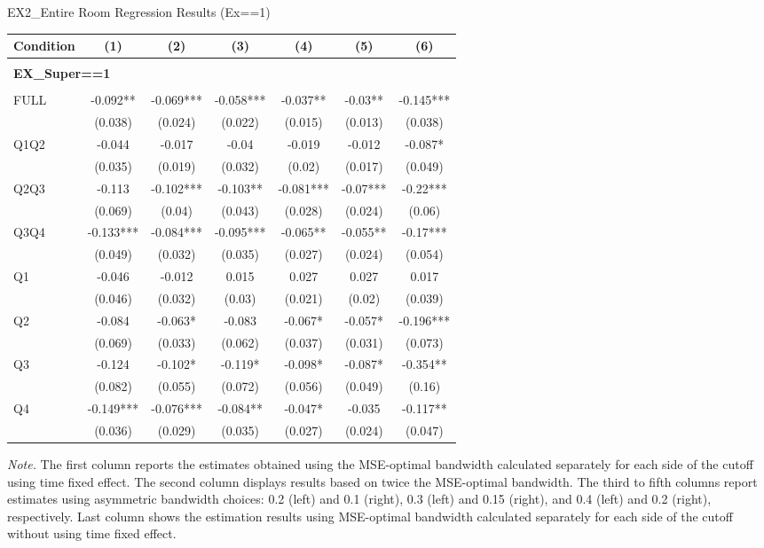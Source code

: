 \begin{table}[]
\TABLE
{EX2\_Entire Room Regression Results (Ex==1) \label{ex2_result_detail1}}{\begin{tabular}{lcccccc}
\hline
Condition & (1) & (2) & (3) & (4) & (5) & (6) \\ \hline
\\ 
\multicolumn{5}{l}{\textbf{EX\_Super==1}} \\ 
\\ 
FULL & -0.092** & -0.069*** & -0.058*** & -0.037** & -0.03** & -0.145*** \\ 
&(0.038)&(0.024) & (0.022)&(0.015)&(0.013)&(0.038)\\ 
Q1Q2 & -0.044 & -0.017 & -0.04 & -0.019 & -0.012 & -0.087* \\ 
&(0.035)&(0.019) & (0.032)&(0.02)&(0.017)&(0.049)\\ 
Q2Q3 & -0.113 & -0.102*** & -0.103** & -0.081*** & -0.07*** & -0.22*** \\ 
&(0.069)&(0.04) & (0.043)&(0.028)&(0.024)&(0.06)\\ 
Q3Q4 & -0.133*** & -0.084*** & -0.095*** & -0.065** & -0.055** & -0.17*** \\ 
&(0.049)&(0.032) & (0.035)&(0.027)&(0.024)&(0.054)\\ 
Q1 & -0.046 & -0.012 & 0.015 & 0.027 & 0.027 & 0.017 \\ 
&(0.046)&(0.032) & (0.03)&(0.021)&(0.02)&(0.039)\\ 
Q2 & -0.084 & -0.063* & -0.083 & -0.067* & -0.057* & -0.196*** \\ 
&(0.069)&(0.033) & (0.062)&(0.037)&(0.031)&(0.073)\\ 
Q3 & -0.124 & -0.102* & -0.119* & -0.098* & -0.087* & -0.354** \\ 
&(0.082)&(0.055) & (0.072)&(0.056)&(0.049)&(0.16)\\ 
Q4 & -0.149*** & -0.076*** & -0.084** & -0.047* & -0.035 & -0.117** \\ 
&(0.036)&(0.029) & (0.035)&(0.027)&(0.024)&(0.047)\\ 
\hline 
\end{tabular}}{\textit{Note.} The first column reports the estimates obtained using the MSE-optimal bandwidth calculated separately for each side of the cutoff using time fixed effect. The second column displays results based on twice the MSE-optimal bandwidth. The third to fifth columns report estimates using asymmetric bandwidth choices: 0.2 (left) and 0.1 (right), 0.3 (left) and 0.15 (right), and 0.4 (left) and 0.2 (right), respectively. Last column shows the estimation results using MSE-optimal bandwidth calculated separately for each side of the cutoff without using time fixed effect.}
\end{table}


